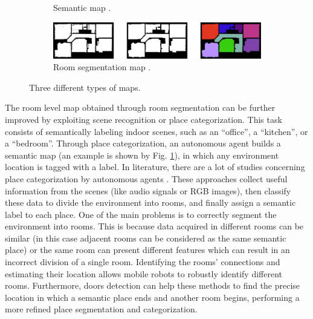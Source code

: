 \begin{figure}[h!]
\begin{subfigure}[b]{0.45\linewidth}
		\caption{Semantic map \cite{placecategorization}.}
		\label{fig:semantic_map}
	\end{subfigure}
	\newline
	\newline
	\begin{subfigure}[b]{0.99\linewidth}
		\centering
		\includegraphics[width=\textwidth]{images/roomsegmentation.png}
		\caption{Room segmentation map \cite{segmentation3d}.}
		\label{fig:room_segmentation_map}
	\end{subfigure}
	\caption{Three different types of maps.}
	
\end{figure}

The room level map obtained through room segmentation can be further improved by exploiting scene recognition or place categorization. This task consists of semantically labeling indoor scenes, such as an ``office'', a ``kitchen'', or a ``bedroom''. Through place categorization, an autonomous agent builds a semantic map (an example is shown by Fig. \ref{fig:semantic_map}), in which any environment location is tagged with a label. In literature, there are a lot of studies concerning place categorization by autonomous agents \cite{scenerecognitionaudio, scenerecognitiononjectdetection, placecategorization, placecategorizationlargescale}. These approaches collect useful information from the scenes (like audio signals or RGB images), then classify these data to divide the environment into rooms, and finally assign a semantic label to each place. One of the main problems is to correctly segment the environment into rooms. This is because data acquired in different rooms can be similar (in this case adjacent rooms can be considered as the same semantic place) or the same room can present different features which can result in an incorrect division of a single room. Identifying the rooms' connections and estimating their location allows mobile robots
to robustly identify different rooms. Furthermore, doors detection can help these methods to find the precise location in which a semantic place ends and another room begins, performing a more refined place segmentation and categorization.  

